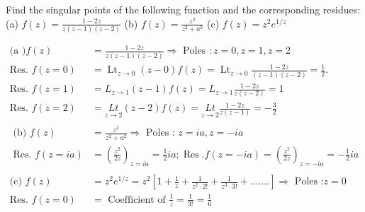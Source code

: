 \begin{exercise}
	 Find the singular points of the following function and the corresponding residues:\\
	(a) $f(z)=\frac{1-2 z}{z(z-1)(z-2)}$\quad
	(b) $f(z)=\frac{z^{2}}{z^{2}+a^{2}}$\quad
	(c) $f(z)=z^{2} e^{1 / z}$
\end{exercise}
\begin{answer}
	\begin{align*}
	\text{(a )}f(z)&=\frac{1-2 z}{z(z-1)(z-2)} \Rightarrow \text { Poles }: z=0, z=1, z=2\\
	\text{Res. }f(z=0)&=\operatorname{Lt}_{z \rightarrow 0}(z-0) f(z)=\operatorname{Lt}_{z \rightarrow 0} \frac{1-2 z}{(z-1)(z-2)}=\frac{1}{2}.\\
	\text{Res. } f(z=1)&=L_{z \rightarrow 1}(z-1) f(z)=L_{z \rightarrow 1} \frac{1-2 z}{z(z-2)}=1\\
	\text{Res. }f(z=2)&=\underset{z \rightarrow 2}{L t}(z-2) f(z)=\underset{z \rightarrow 2}{L t} \frac{1-2 z}{z(z-1)}=-\frac{3}{2}\\\\
\text{	(b) }f(z)&=\frac{z^{2}}{z^{2}+a^{2}} \Rightarrow\text{ Poles : }z=i a, z=-i a\\
	\text { Res. } f(z=i a)&=\left(\frac{z^{2}}{2 z}\right)_{z=i a}=\frac{1}{2} i a ; \operatorname{Res} . f(z=-i a)=\left(\frac{z^{2}}{2 z}\right)_{z=-i a}=-\frac{1}{2} i a\\\\
	\text{(c) }f(z)&=z^{2} e^{1 / z}=z^{2}\left[1+\frac{1}{z}+\frac{1}{z^{2} \cdot 2 !}+\frac{1}{z^{3} \cdot 3 !}+\ldots \ldots .\right] \Rightarrow\text{ Poles :} z=0\\
	\text{Res. }f(z=0)&=\text{ Coefficient of }\frac{1}{z}=\frac{1}{3 !}=\frac{1}{6}
	\end{align*}
\end{answer}
